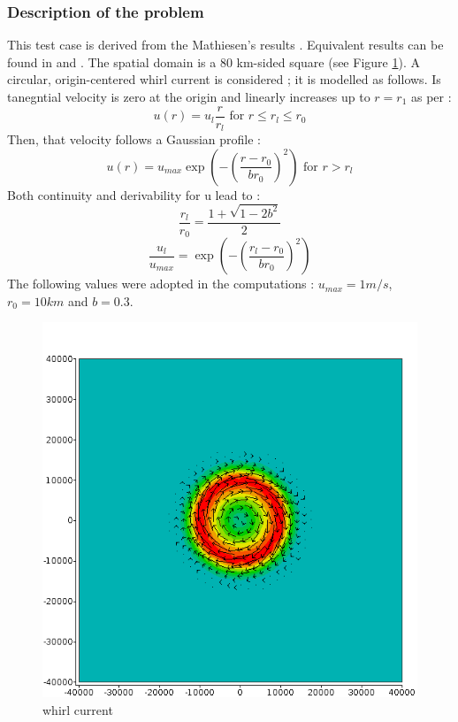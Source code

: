 \subsubsection{Description of the problem}
%
This test case is derived from the Mathiesen's results \cite{mathiesen}.
Equivalent results can be found in \cite{tolman} and \cite{hubbert}. The
spatial domain is a 80 km-sided square (see Figure \ref{current}). A circular,
origin-centered whirl current is considered ; it is modelled as follows. Is
tanegntial velocity is zero at the origin and linearly increases up to $r=r_1$
as per :
$$
u(r) = u_l\frac{r}{r_l} \mbox{ for } r\le r_l\le r_0
$$
Then, that velocity follows a Gaussian profile :
$$
u(r)=u_{max} \exp ( -(\frac{r-r_0}{br_0})^2 ) \mbox{ for } r > r_l
$$
Both continuity and derivability for u lead to :
$$
\frac{r_l}{r_0}=\frac{1+ \sqrt{1-2b^2}}{2} %
$$
$$
\frac{u_l}{u_{max}}= \exp ( -(\frac{r_l-r_0}{br_0})^2 )
$$
The following values were adopted in the computations : $u_{max}=1m/s$,
$r_0=10km$ and $b=0.3$.
%
%
\begin{figure} [!h]
\centering
\includegraphics[scale = 0.7]{current.png}
 \caption{whirl current}
\label{current}
\end{figure}
